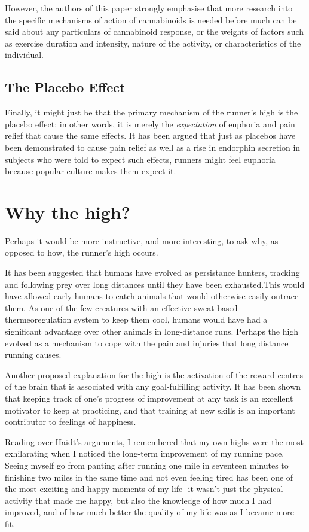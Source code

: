 \documentclass[twocolumn]{article}
\begin{document}
	However, the authors of this paper strongly emphasise that more research into the specific mechanisms of action of cannabinoids is needed before much can be said about any particulars of cannabinoid response, or the weights of factors such as exercise duration and intensity, nature of the activity, or characteristics of the individual. 
	
	\subsection{The Placebo Effect}
		Finally, it might just be that the primary mechanism of the runner's high is the placebo effect; in other words, it is merely the \emph{expectation} of euphoria and pain relief that cause the same effects. It has been argued \citep{placebo} that just as placebos have been demonstrated to cause pain relief as well as a rise in endorphin secretion in subjects who were told to expect such effects, runners might feel euphoria because popular culture makes them expect it.		
		
\section{Why the high?}
	Perhaps it would be more instructive, and more interesting, to ask why, as opposed to how, the runner's high occurs.
	
	It has been suggested \citep{hunt} that humans have evolved as persistance hunters, tracking and following prey over long distances until they have been exhausted.This would have allowed early humans to catch animals that would otherwise easily outrace them. As one of the few creatures with an effective sweat-based thermeoregulation system to keep them cool, humans would have had a significant advantage over other animals in long-distance runs. Perhaps the high evolved as a mechanism to cope with the pain and injuries that long distance running causes.
	
	Another proposed explanation for the high is the activation of the reward centres of the brain that is associated with any goal-fulfilling activity. It has been shown \citep{happiness} that keeping track of one's progress of improvement at any task is an excellent motivator to keep at practicing, and that training at new skills is an important contributor to feelings of happiness.
	
	Reading over Haidt's arguments, I remembered that my own highs were the most exhilarating  when I noticed the long-term improvement of my running pace. Seeing myself go from panting after running one mile in seventeen minutes to finishing two miles in the same time and not even feeling tired has been one of the most exciting and happy moments of my life- it wasn't just the physical activity that made me happy, but also the knowledge of how much I had improved, and of how much better the quality of my life was as I became more fit.
	
\end{document}
